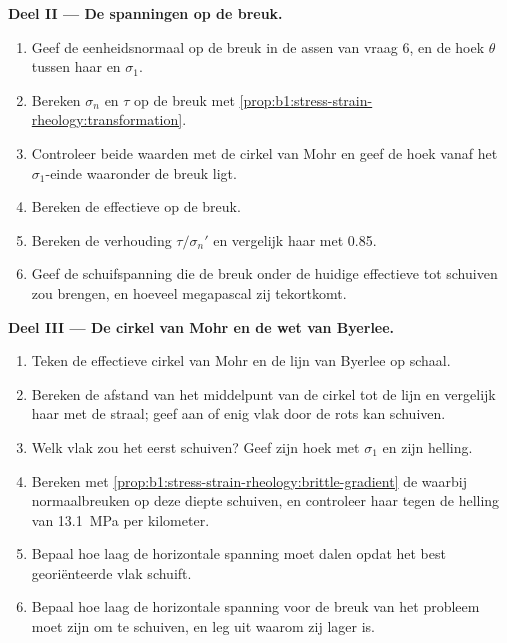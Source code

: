 \begin{problem}
\medskip
\noindent\textbf{Deel II --- De spanningen op de breuk.}
\begin{enumerate}[resume]
  \item Geef de eenheidsnormaal op de breuk in de assen van vraag 6, en de hoek $\theta$ tussen haar en $\sigma_1$.
  \item Bereken $\sigma_n$ en $\tau$ op de breuk met \cref{prop:b1:stress-strain-rheology:transformation}.
  \item Controleer beide waarden met de cirkel van Mohr en geef de hoek vanaf het $\sigma_1$-einde waaronder de breuk ligt.
  \item Bereken de effectieve  op de breuk.
  \item Bereken de verhouding $\tau/\sigma_n'$ en vergelijk haar met 0.85.
  \item Geef de schuifspanning die de breuk onder de huidige effectieve  tot schuiven zou brengen, en hoeveel megapascal zij tekortkomt.
\end{enumerate}

\medskip
\noindent\textbf{Deel III --- De cirkel van Mohr en de wet van Byerlee.}
\begin{enumerate}[resume]
  \item Teken de effectieve cirkel van Mohr en de lijn van Byerlee op schaal.
  \item Bereken de afstand van het middelpunt van de cirkel tot de lijn en vergelijk haar met de straal; geef aan of enig vlak door de rots kan schuiven.
  \item Welk vlak zou het eerst schuiven? Geef zijn hoek met $\sigma_1$ en zijn helling.
  \item Bereken met \cref{prop:b1:stress-strain-rheology:brittle-gradient} de  waarbij normaalbreuken op deze diepte schuiven, en controleer haar tegen de helling van \qty{13.1}{MPa} per kilometer.
  \item Bepaal hoe laag de horizontale spanning moet dalen opdat het best georiënteerde vlak schuift.
  \item Bepaal hoe laag de horizontale spanning voor de breuk van het probleem moet zijn om te schuiven, en leg uit waarom zij lager is.
\end{enumerate}


\end{problem}
